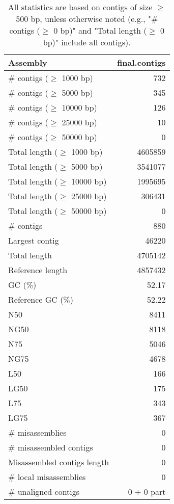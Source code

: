 \documentclass[12pt,a4paper]{article}
\begin{document}
\begin{table}[ht]
\begin{center}
\caption{All statistics are based on contigs of size $\geq$ 500 bp, unless otherwise noted (e.g., "\# contigs ($\geq$ 0 bp)" and "Total length ($\geq$ 0 bp)" include all contigs).}
\begin{tabular}{|l*{1}{|r}|}
\hline
Assembly & final.contigs \\ \hline
\# contigs ($\geq$ 1000 bp) & 732 \\ \hline
\# contigs ($\geq$ 5000 bp) & 345 \\ \hline
\# contigs ($\geq$ 10000 bp) & 126 \\ \hline
\# contigs ($\geq$ 25000 bp) & 10 \\ \hline
\# contigs ($\geq$ 50000 bp) & 0 \\ \hline
Total length ($\geq$ 1000 bp) & 4605859 \\ \hline
Total length ($\geq$ 5000 bp) & 3541077 \\ \hline
Total length ($\geq$ 10000 bp) & 1995695 \\ \hline
Total length ($\geq$ 25000 bp) & 306431 \\ \hline
Total length ($\geq$ 50000 bp) & 0 \\ \hline
\# contigs & 880 \\ \hline
Largest contig & 46220 \\ \hline
Total length & 4705142 \\ \hline
Reference length & 4857432 \\ \hline
GC (\%) & 52.17 \\ \hline
Reference GC (\%) & 52.22 \\ \hline
N50 & 8411 \\ \hline
NG50 & 8118 \\ \hline
N75 & 5046 \\ \hline
NG75 & 4678 \\ \hline
L50 & 166 \\ \hline
LG50 & 175 \\ \hline
L75 & 343 \\ \hline
LG75 & 367 \\ \hline
\# misassemblies & 0 \\ \hline
\# misassembled contigs & 0 \\ \hline
Misassembled contigs length & 0 \\ \hline
\# local misassemblies & 0 \\ \hline
\# unaligned contigs & 0 + 0 part \\ \hline

\end{tabular}
\end{center}
\end{table}
\end{document}
